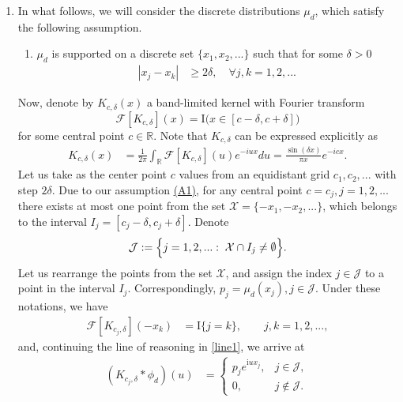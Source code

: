 \documentclass[numbers,webpdf,imaiai]{ima-authoring-template}%
\theoremstyle{thmstyletwo}%
\newcommand{\R}{\mathbb{R}}
\newcommand{\C}{\mathbb{C}}
\newcommand{\F}{\mathcal{F}}
\newcommand{\I}{{\mathrm{I}}}
\renewcommand{\i}{\mathrm{i}}
\newcommand{\w}{\omega}
\newcommand{\mJ}{\mathcal{J}}
\newcommand{\mX}{\mathcal{X}}
\newcommand{\supp}{\operatorname{supp}}
\newcommand{\AP}{\operatorname{AP}}
\numberwithin{equation}{section}
\begin{document}
\begin{enumerate}
\item In what follows, we will consider the discrete distributions \(\mu_d\), which satisfy the following assumption. 
\begin{enumerate}
\item[(A1)] \label{cond_A1} \(\mu_d\) is supported on a discrete set \(\{x_1, x_2,...\}\) such that for some \(\delta>0\)
\begin{align}
|x_j - x_k| &\geq 2\delta, \quad \forall j, k = 1, 2, ...
\end{align}
\end{enumerate}
Now, denote by $K_{c,\delta}(x)$ a band-limited kernel with Fourier transform%
\begin{equation}\label{star1}
    \F[K_{c,\delta}](x) = \I \bigl(x \in [c-\delta, c+\delta]\bigr)
\end{equation}
for some central point $c\in \R$. Note that \(K_{c,\delta}\)  can be expressed explicitly as 
\begin{align}\label{star2}
    K_{c,\delta}(x) &= \frac{1}{2\pi}\int_{\R} \F[K_{c,\delta}](u) e^{-iux}du =  \frac{\sin(\delta x)}{\pi x} e^{-i c x}.
\end{align}
Let us take as the center point \(c\) values from an equidistant grid \(c_1, c_2,...\) with step \(2 \delta.\) Due to our assumption \hyperref[cond_A1]{(A1)}, for any central point \(c=c_j, j=1,2,...\) there exists at most one point from the set \(\mathcal{X}=\{-x_1, -x_2,...\}\), which belongs to the interval \( I_j = [c_j-\delta, c_j+\delta]. \) Denote \[\mJ:= \Bigl\{ j =1,2,...: \;\mX \cap I_j \ne \emptyset \Bigr\}.\]
Let us rearrange the points  from the set \(\mX\), and assign the index \(j \in \mJ\) to a point in the interval $I_j$. Correspondingly, \(p_j = \mu_d(x_j), j \in \mJ\). Under these notations, we have 
\begin{align}\label{eq37}
\F[K_{c_j,\delta}](-x_k) &= \I \bigl\{ j = k \bigr\} , \qquad j, k  = 1,  2, ...,
\end{align}
and, continuing the line of reasoning in \eqref{line1}, we arrive at
\begin{align}\label{eq1}
     (K_{c_j,\delta} * \phi_d)(u) &=  \begin{cases} p_j  e^{\i u x_j},& j \in \mJ,\\
     0,&j \notin \mJ.
     \end{cases}
\end{align}


\end{enumerate}
\end{document}
